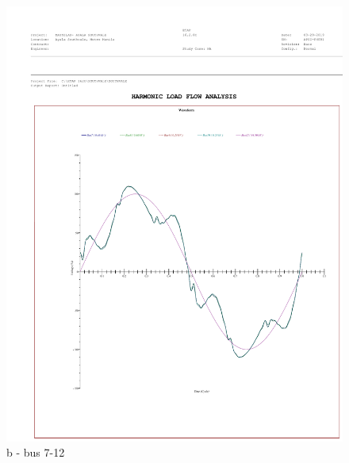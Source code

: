 \begin{figure}
\begin{minipage}[b]{0.4\linewidth}
		\includegraphics[width=\textwidth]{figures/fig_ch04_elecaudit_bus_harmonic_waveform712}
		\caption*{b - bus 7-12}
	\end{minipage}
	\hspace{0.05cm}
	\begin{minipage}[b]{0.4\linewidth}
		\centering

\end{minipage}
\end{figure}
